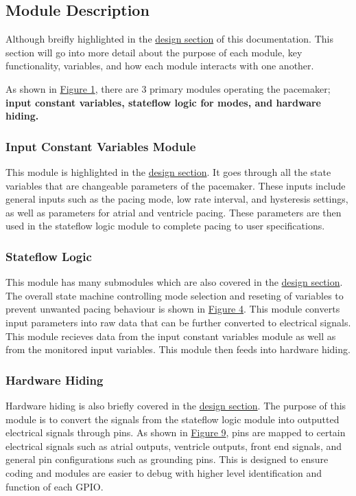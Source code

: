 \documentclass{article}
\begin{document}
\newpage
\subsection{Module Description}

Although breifly highlighted in the \hyperref[dessec]{design section} of this documentation. This section will go 
into more detail about the purpose of each module, key functionality, variables, and how each module interacts with 
one another. 

As shown in \hyperref[SimWholeView]{Figure 1}, there are 3 primary modules operating the pacemaker; \textbf{input constant variables, 
stateflow logic for modes, and hardware hiding.}

\subsubsection{Input Constant Variables Module}
This module is highlighted in the \hyperref[dessec]{design section}. It goes through all the state variables that 
are changeable parameters of the pacemaker. These inputs include general inputs such as the pacing mode, low rate interval, and hysteresis settings, as well 
as parameters for atrial and ventricle pacing. These parameters are then used in the stateflow logic module to 
complete pacing to user specifications.

\subsubsection{Stateflow Logic}
This module has many submodules which are also covered in the \hyperref[dessec]{design section}. The overall state machine controlling 
mode selection and reseting of variables to prevent unwanted pacing behaviour is shown in \hyperref[StateMod]{Figure 4}. This module 
converts input parameters into raw data that can be further converted to electrical signals. This module recieves data 
from the input constant variables module as well as from the monitored input variables. This module then feeds into 
hardware hiding. 

\subsubsection{Hardware Hiding}
Hardware hiding is also briefly covered in the \hyperref[dessec]{design section}. The purpose of this module is 
to convert the signals from the stateflow logic module into outputted electrical signals through pins. As shown in 
\hyperref[HardHide]{Figure 9}, pins are mapped to certain electrical signals such as atrial outputs, ventricle outputs, 
front end signals, and general pin configurations such as grounding pins. This is designed to ensure coding and modules 
are easier to debug with higher level identification and function of each GPIO. 
\end{document}
